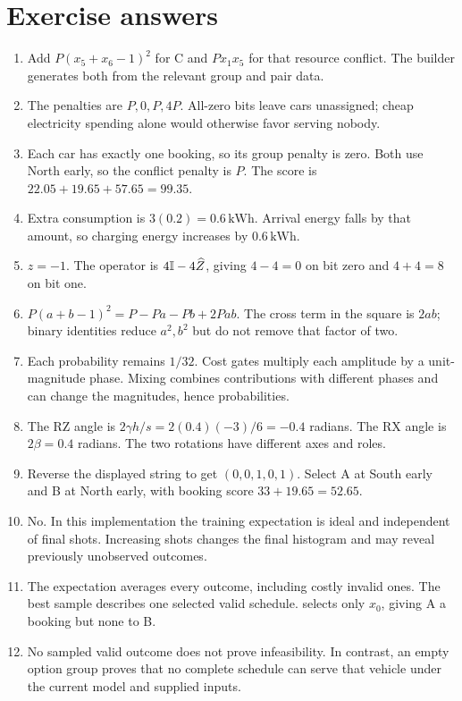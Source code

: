 \section{Exercise answers}\label{app:answers}
\begin{enumerate}[label=\textbf{\arabic*.}]
\item Add $P(x_5+x_6-1)^2$ for C and $Px_1x_5$ for that resource conflict.
      The builder generates both from the relevant group and pair data.
\item The penalties are $P,0,P,4P$. All-zero bits leave cars unassigned;
      cheap electricity spending alone would otherwise favor serving nobody.
\item Each car has exactly one booking, so its group penalty is zero. Both
      use North early, so the conflict penalty is $P$. The score is
      $22.05+19.65+57.65=99.35$.
\item Extra consumption is $3(0.2)=0.6\,\mathrm{kWh}$. Arrival energy falls by
      that amount, so charging energy increases by $0.6\,\mathrm{kWh}$.
\item $z=-1$. The operator is $4\mathbb{I}-4\widehat Z$, giving $4-4=0$ on bit zero
      and $4+4=8$ on bit one.
\item $P(a+b-1)^2=P-Pa-Pb+2Pab$. The cross term in the square is $2ab$;
      binary identities reduce $a^2,b^2$ but do not remove that factor of two.
\item Each probability remains $1/32$. Cost gates multiply each amplitude
      by a unit-magnitude phase. Mixing combines contributions with different
      phases and can change the magnitudes, hence probabilities.
\item The RZ angle is $2\gamma h/s=2(0.4)(-3)/6=-0.4$ radians. The RX angle
      is $2\beta=0.4$ radians. The two rotations have different axes and roles.
\item Reverse the displayed string to get $(0,0,1,0,1)$. Select A at South
      early and B at North early, with booking score $33+19.65=52.65$.
\item No. In this implementation the training expectation is ideal and
      independent of final shots. Increasing shots changes the final histogram
      and may reveal previously unobserved outcomes.
\item The expectation averages every outcome, including costly invalid ones.
      The best sample describes one selected valid schedule. 
      selects only $x_0$, giving A a booking but none to B.
\item No sampled valid outcome does not prove infeasibility. In contrast,
      an empty option group proves that no complete schedule can serve that
      vehicle under the current model and supplied inputs.
\end{enumerate}

